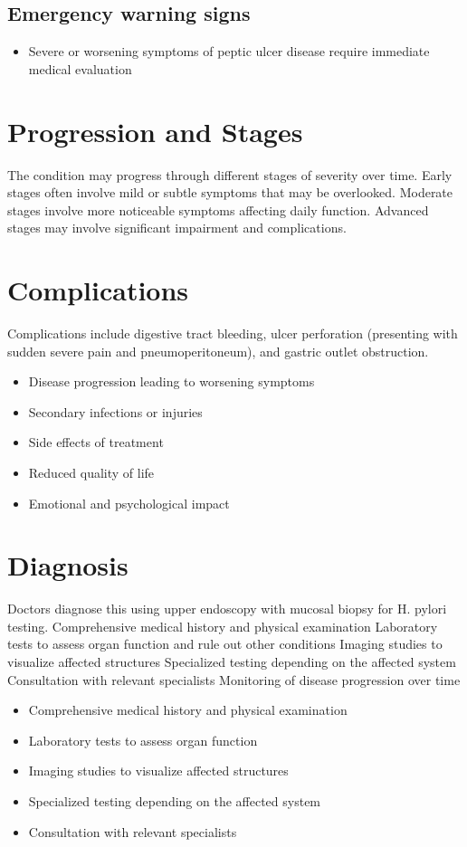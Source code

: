 \subsection{Emergency warning signs}
\begin{itemize}[noitemsep]
  \item Severe or worsening symptoms of peptic ulcer disease require immediate medical evaluation
\end{itemize}
\section{Progression and Stages}
The condition may progress through different stages of severity over time. Early stages often involve mild or subtle symptoms that may be overlooked. Moderate stages involve more noticeable symptoms affecting daily function. Advanced stages may involve significant impairment and complications.
\section{Complications}
Complications include digestive tract bleeding, ulcer perforation (presenting with sudden severe pain and pneumoperitoneum), and gastric outlet obstruction.

\begin{itemize}[noitemsep]
  \item Disease progression leading to worsening symptoms
  \item Secondary infections or injuries
  \item Side effects of treatment
  \item Reduced quality of life
  \item Emotional and psychological impact
\end{itemize}
\section{Diagnosis}
Doctors diagnose this using upper endoscopy with mucosal biopsy for H. pylori testing. Comprehensive medical history and physical examination Laboratory tests to assess organ function and rule out other conditions Imaging studies to visualize affected structures Specialized testing depending on the affected system Consultation with relevant specialists Monitoring of disease progression over time

\begin{itemize}[noitemsep]
  \item Comprehensive medical history and physical examination
  \item Laboratory tests to assess organ function
  \item Imaging studies to visualize affected structures
  \item Specialized testing depending on the affected system
  \item Consultation with relevant specialists
\end{itemize}
